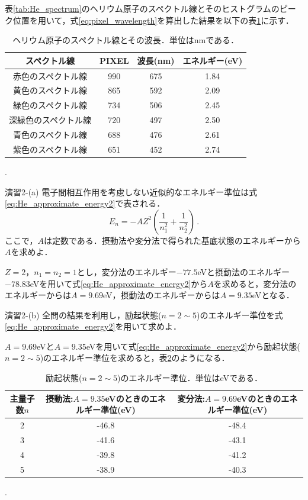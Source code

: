\documentclass[a4paper,dvipdfmx,10.5pt]{jarticle}
\begin{document}
表\ref{tab:He_spectrum}のヘリウム原子のスペクトル線とそのヒストグラムのピーク位置を用いて，式\eqref{eq:pixel_wavelength}を算出した結果を以下の表\ref{tab:He_wavelength}に示す．
\begin{table}[htbp]
  \begin{center}
    \begin{tabular}{|c|c|c|c|}
       \hline
    スペクトル線 & PIXEL &波長(nm) & エネルギー(eV) \\
      \hline
    赤色のスペクトル線 & 990 & 675 & 1.84\\
    黄色のスペクトル線 & 865 & 592 & 2.09 \\
    緑色のスペクトル線 & 734 & 506 & 2.45 \\
    深緑色のスペクトル線 & 720 & 497 & 2.50 \\
    青色のスペクトル線 & 688 & 476 & 2.61 \\
    紫色のスペクトル線 & 651 & 452 & 2.74 \\
    \hline
    \end{tabular}
    \caption{ヘリウム原子のスペクトル線とその波長．単位はnmである．}
    .\label{tab:He_wavelength}
  \end{center}
\end{table}

\begin{itembox}[l]{演習2-(a)}
  電子間相互作用を考慮しない近似的なエネルギー準位は式\eqref{eq:He_approximate_energy2}で表される．
  \begin{equation}
    E_n = -AZ^2\left(\frac{1}{n_1^2} + \frac{1}{n_2^2}\right)\,.\label{eq:He_approximate_energy2}
  \end{equation}
  ここで，$A$は定数である．摂動法や変分法で得られた基底状態のエネルギーから$A$を求めよ．
\end{itembox}
\quad $Z=2$，$n_1=n_2=1$とし，変分法のエネルギー$-77.5$eVと摂動法のエネルギー$-78.83$eVを用いて式\eqref{eq:He_approximate_energy2}から$A$を求めると，変分法のエネルギーからは$A=9.69$eV，摂動法のエネルギーからは$A=9.35$eVとなる．
\begin{itembox}[l]{演習2-(b)}
  全問の結果を利用し，励起状態($n=2\sim 5$)のエネルギー準位を式\eqref{eq:He_approximate_energy2}を用いて求めよ．
\end{itembox}
\quad $A=9.69$eVと$A=9.35$eVを用いて式\eqref{eq:He_approximate_energy2}から励起状態($n=2\sim 5$)のエネルギー準位を求めると，表\ref{tab:He_energy}のようになる．
\begin{table}[htbp]
  \begin{center}
    \begin{tabular}{|c|c|c|}
       \hline
    主量子数$n$ & 摂動法:$A=9.35$eVのときのエネルギー準位(eV) & 変分法:$A=9.69$eVのときのエネルギー準位(eV) \\
      \hline
    2 & -46.8 & -48.4\\
    3 & -41.6 & -43.1\\
    4 & -39.8 & -41.2\\
    5 & -38.9 & -40.3\\
    \hline
    \end{tabular}
    \caption{励起状態($n=2\sim 5$)のエネルギー準位．単位はeVである．}
    .\label{tab:He_energy}
  \end{center}
\end{table}
\end{document}
